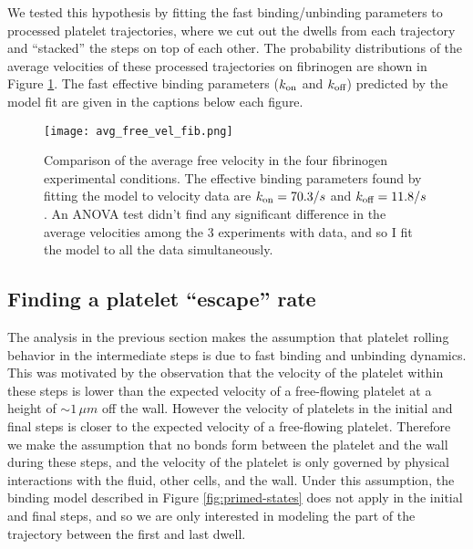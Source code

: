 \documentclass{article}
\newcommand{\tn}{\textnormal}
\begin{document}
We tested this hypothesis by fitting the fast binding/unbinding
parameters to processed platelet trajectories, where we cut out the
dwells from each trajectory and ``stacked'' the steps on top of each
other. The probability distributions of the average velocities of
these processed trajectories on fibrinogen are shown in Figure
\ref{fig:avg-free-vel-fib}. The fast effective binding parameters
($k_\tn{on}$ and $k_\tn{off}$) predicted by the model fit are given in
the captions below each figure.


\begin{figure}
  \centering
  \texttt{[image: avg\_free\_vel\_fib.png]}
  \caption{Comparison of the average free velocity in the four
    fibrinogen experimental conditions. The effective binding
    parameters found by fitting the model to velocity data are
    $k_\tn{on} = 70.3 / s$ and $k_\tn{off} = 11.8 / s$. An ANOVA test
    didn't find any significant difference in the average velocities
    among the 3 experiments with data, and so I fit the model to all
    the data simultaneously.}
  \label{fig:avg-free-vel-fib}
\end{figure}

\subsection{Finding a platelet ``escape'' rate}
\label{sec:find-plat-escape}

The analysis in the previous section makes the assumption that
platelet rolling behavior in the intermediate steps is due to fast
binding and unbinding dynamics. This was motivated by the observation
that the velocity of the platelet within these steps is lower than the
expected velocity of a free-flowing platelet at a height of
$\sim 1 \, \mu m$ off the wall. However the velocity of platelets in
the initial and final steps is closer to the expected velocity of a
free-flowing platelet. Therefore we make the assumption that no bonds
form between the platelet and the wall during these steps, and the
velocity of the platelet is only governed by physical interactions
with the fluid, other cells, and the wall. Under this assumption, the
binding model described in Figure \ref{fig:primed-states} does not
apply in the initial and final steps, and so we are only interested in
modeling the part of the trajectory between the first and last dwell.
\end{document}
